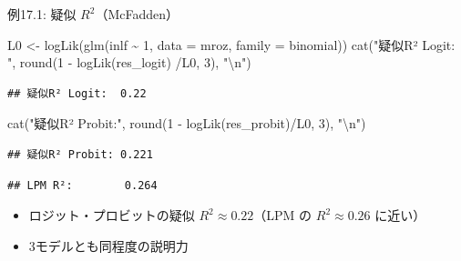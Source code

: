 \documentclass[
  ignorenonframetext,
]{beamer}
\newenvironment{Shaded}{\begin{snugshade}}{\end{snugshade}}
\newcommand{\AttributeTok}[1]{\textcolor[rgb]{0.77,0.63,0.00}{#1}}
\newcommand{\DecValTok}[1]{\textcolor[rgb]{0.00,0.00,0.81}{#1}}
\newcommand{\FunctionTok}[1]{\textcolor[rgb]{0.00,0.00,0.00}{#1}}
\newcommand{\NormalTok}[1]{#1}
\newcommand{\OtherTok}[1]{\textcolor[rgb]{0.56,0.35,0.01}{#1}}
\newcommand{\SpecialCharTok}[1]{\textcolor[rgb]{0.00,0.00,0.00}{#1}}
\newcommand{\StringTok}[1]{\textcolor[rgb]{0.31,0.60,0.02}{#1}}
\providecommand{\tightlist}{%
  \setlength{\itemsep}{0pt}\setlength{\parskip}{0pt}}
\begin{document}
\begin{frame}[fragile]{例17.1: 疑似 \(R^2\)（McFadden）}
\protect\hypertarget{ux4f8b17.1-ux7591ux4f3c-r2mcfadden}{}
\footnotesize

\begin{Shaded}
\begin{Highlighting}[]
\NormalTok{L0 }\OtherTok{\textless{}{-}} \FunctionTok{logLik}\NormalTok{(}\FunctionTok{glm}\NormalTok{(inlf }\SpecialCharTok{\textasciitilde{}} \DecValTok{1}\NormalTok{, }\AttributeTok{data =}\NormalTok{ mroz, }\AttributeTok{family =}\NormalTok{ binomial))}
\FunctionTok{cat}\NormalTok{(}\StringTok{"疑似R² Logit: "}\NormalTok{, }\FunctionTok{round}\NormalTok{(}\DecValTok{1} \SpecialCharTok{{-}} \FunctionTok{logLik}\NormalTok{(res\_logit) }\SpecialCharTok{/}\NormalTok{L0, }\DecValTok{3}\NormalTok{), }\StringTok{"}\SpecialCharTok{\textbackslash{}n}\StringTok{"}\NormalTok{)}
\end{Highlighting}
\end{Shaded}

\begin{verbatim}
## 疑似R² Logit:  0.22
\end{verbatim}

\begin{Shaded}
\begin{Highlighting}[]
\FunctionTok{cat}\NormalTok{(}\StringTok{"疑似R² Probit:"}\NormalTok{, }\FunctionTok{round}\NormalTok{(}\DecValTok{1} \SpecialCharTok{{-}} \FunctionTok{logLik}\NormalTok{(res\_probit)}\SpecialCharTok{/}\NormalTok{L0, }\DecValTok{3}\NormalTok{), }\StringTok{"}\SpecialCharTok{\textbackslash{}n}\StringTok{"}\NormalTok{)}
\end{Highlighting}
\end{Shaded}

\begin{verbatim}
## 疑似R² Probit: 0.221
\end{verbatim}

\begin{Shaded}
\end{Shaded}

\begin{verbatim}
## LPM R²:        0.264
\end{verbatim}

\normalsize

\begin{itemize}
\tightlist
\item
  ロジット・プロビットの疑似 \(R^2 \approx 0.22\)（LPM の
  \(R^2 \approx 0.26\) に近い）
\item
  3モデルとも同程度の説明力
\end{itemize}
\end{frame}
\end{document}
